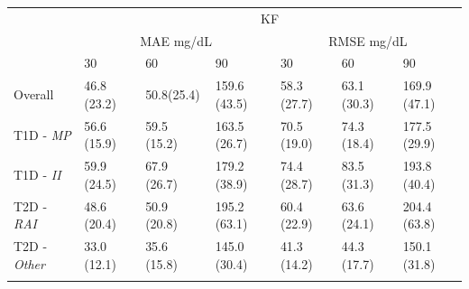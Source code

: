 \begin{table}[b!]
\begin{tabular}{lllllll}
			\\
			& \multicolumn{6}{c}{KF}                                                \\ \cline{2-7}
			\multicolumn{1}{l|}{}                           & \multicolumn{3}{c|}{MAE mg/dL}          & \multicolumn{3}{c|}{RMSE mg/dL}         \\ \cline{2-7}
			\multicolumn{1}{l|}{}                           & 30 & 60 & \multicolumn{1}{l|}{90} & 30 & 60 & \multicolumn{1}{l|}{90} \\ \hline
			\multicolumn{1}{l|}{Overall}              & 46.8 (23.2) & 50.8(25.4) & \multicolumn{1}{l|}{159.6 (43.5)} & 58.3 (27.7) & 63.1 (30.3) & \multicolumn{1}{l|}{169.9 (47.1)} \\
			\multicolumn{1}{l|}{T1D - {\sl MP}}         & 56.6 (15.9) & 59.5 (15.2) & \multicolumn{1}{l|}{163.5 (26.7)} & 70.5 (19.0) & 74.3 (18.4) & \multicolumn{1}{l|}{177.5 (29.9)} \\
			\multicolumn{1}{l|}{T1D - {\sl II}}    & 59.9 (24.5) & 67.9 (26.7) & \multicolumn{1}{l|}{179.2 (38.9)} & 74.4 (28.7) & 83.5 (31.3) & \multicolumn{1}{l|}{193.8 (40.4)} \\
			\multicolumn{1}{l|}{T2D - {\sl RAI}} & 48.6 (20.4) & 50.9 (20.8) & \multicolumn{1}{l|}{195.2 (63.1)} & 60.4 (22.9) & 63.6 (24.1) & \multicolumn{1}{l|}{204.4 (63.8)} \\
			\multicolumn{1}{l|}{T2D - {\sl Other}}      & 33.0 (12.1) & 35.6 (15.8) & \multicolumn{1}{l|}{145.0 (30.4)} & 41.3 (14.2) & 44.3 (17.7) & \multicolumn{1}{l|}{150.1 (31.8)} \\ \hline
			
			
			\\
			

\end{tabular}
\end{table}
